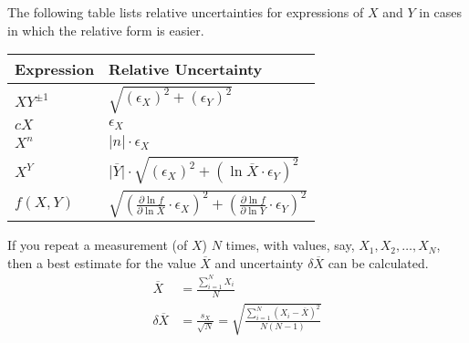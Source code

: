 \documentclass[12pt,twocolumn]{article}
\newcommand{\aX}{\overline X}
\newcommand{\aY}{\overline Y}
\newcommand{\eX}{\epsilon_X}
\newcommand{\eY}{\epsilon_Y}
\newcommand{\quadrature}[2]{\sqrt{\left({#1}\right)^2+\left({#2}\right)^2}}
\begin{document}
\vspace{1em}
\noindent The following table lists relative uncertainties for expressions of $X$ and $Y$ in cases in which the relative form is easier.

{\centering
\begin{tabular}{@{}l@{\quad$\pm$\quad}l@{}} \toprule
Expression & Relative Uncertainty \\ \midrule
$XY^{\pm1}$ 	& $\quadrature{\eX}{\eY}$ \\
$cX$			& $\eX$ \\
$X^n$			& $\lvert n\rvert\cdot\eX$ \\
$X^Y$			& $\lvert \aY\rvert\cdot\quadrature{\eX}{\ln \aX\cdot\eY}$ \\
$f(X,Y)$ 		& $\quadrature{\frac{\partial\ln f}{\partial\ln X}\cdot\eX}{\frac{\partial\ln f}{\partial\ln Y}\cdot\eY}$ \\
\bottomrule
\end{tabular}
}

\begin{mdframed}
\noindent If you repeat a measurement (of $X$) $N$ times, with values, say, $X_1, X_2, \ldots, X_N$, then a best estimate for the value $\overline{X}$ and uncertainty $\delta\overline{X}$ can be calculated.
\begin{align}
\overline{X} &= \frac{\sum\limits_{i=1}^{N} X_i}{N} \\
\delta\overline{X} &= \frac{s_X}{\sqrt{N}}=\sqrt{\frac{\sum\limits_{i=1}^{N} (X_i-\overline{X})^2}{N(N-1)}}
\end{align}
\end{mdframed}
\end{document}
